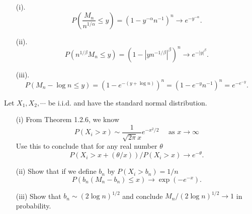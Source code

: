 \documentclass[en, normal, 12pt, black]{elegantnote}
\newenvironment{exercise}[1]{\begin{tcolorbox}[colback=black!15, colframe=black!80, breakable, title=#1]}{\end{tcolorbox}}
\newenvironment{solution}{\begin{tcolorbox}[colback=white, colframe=black!50, breakable, title=Solution. ]\setlength{\parskip}{0.8em}}{\end{tcolorbox}}
\begin{document}
    \begin{solution}
        \begin{itemize}
            \item[(i).] \[
                P\left(\frac{M_n}{n^{1/\alpha}}\leqslant y\right)=\left(1-y^{-\alpha}n^{-1}\right)^n\longrightarrow e^{-y^{-\alpha}}. 
            \]
            \item[(ii).] \[
                P\left(n^{1/\beta}M_n\leqslant y\right)=\left(1-|yn^{-1/\beta}|^{\beta}\right)^n\longrightarrow e^{-|y|^{\beta}}. 
            \]
            \item[(iii).] \[
                P(M_n - \log n \leqslant y)=\left(1-e^{-(y+\log n)}\right)^n=\left(1-e^{-y}n^{-1}\right)^n=e^{-e^{-y}}. 
            \]
        \end{itemize}
    \end{solution}
    
    \begin{exercise}{3.2.3}
        Let $X_{1}, X_{2}, \cdots$ be i.i.d. and have the standard normal distribution. 
        \begin{itemize}
            \item[(i)] From Theorem 1.2.6, we know
            \[
                P\left(X_{i}>x\right) \sim \frac{1}{\sqrt{2 \pi} x} e^{-x^{2} / 2} \quad \text { as } x \rightarrow \infty
            \]
            Use this to conclude that for any real number $\theta$
            \[
                P\left(X_{i}>x+(\theta / x)\right) / P\left(X_{i}>x\right) \rightarrow e^{-\theta}. 
            \]
            \item[(ii)] Show that if we define $b_{n}$ by $P\left(X_{i}>b_{n}\right)=1 / n$
            \[
                P\left(b_{n}\left(M_{n}-b_{n}\right) \leq x\right) \rightarrow \exp \left(-e^{-x}\right). 
            \]
            \item[(iii)] Show that $b_{n} \sim(2 \log n)^{1 / 2}$ and conclude $M_{n} /(2 \log n)^{1 / 2} \rightarrow 1$ in probability. 
        \end{itemize}
    \end{exercise}
\end{document}
